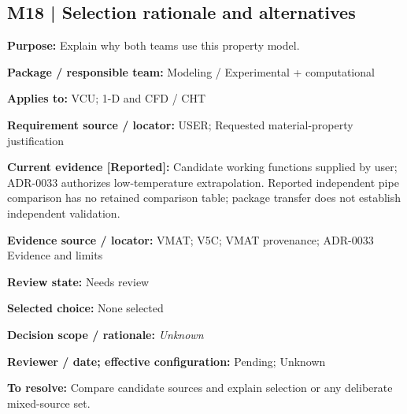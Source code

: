 \documentclass[11pt]{article}
\begin{document}
\par\noindent\begin{minipage}{\textwidth}\small\setlength{\parskip}{2pt}
\subsection*{M18 | Selection rationale and alternatives}
\textbf{Purpose:} Explain why both teams use this property model.\par
\textbf{Package / responsible team:} Modeling / Experimental + computational\par
\textbf{Applies to:} VCU; 1-D and CFD / CHT\par
\textbf{Requirement source / locator:} USER; Requested material-property justification\par
\textbf{Current evidence [Reported]:} Candidate working functions supplied by user; ADR-0033 authorizes low-temperature extrapolation. Reported independent pipe comparison has no retained comparison table; package transfer does not establish independent validation.\par
\textbf{Evidence source / locator:} VMAT; V5C; VMAT provenance; ADR-0033 Evidence and limits\par
\textbf{Review state:} Needs review\par
\textbf{Selected choice:} None selected\par
\textbf{Decision scope / rationale:} \textit{Unknown}\par
\textbf{Reviewer / date; effective configuration:} Pending; Unknown\par
\textbf{To resolve:} Compare candidate sources and explain selection or any deliberate mixed-source set.\par
\end{minipage}\par\vspace{5pt}
\end{document}
